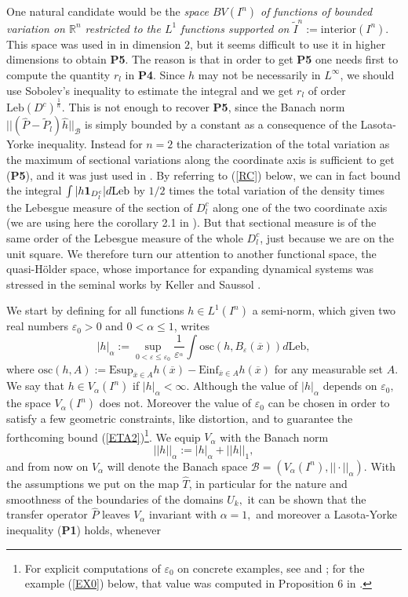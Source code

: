 \documentclass[12pt,reqno,a4paper]{amsart}
\let\tilde\widetilde
\def\Le{\text{Leb}}
\def\a{\alpha}
\def\eps{\varepsilon}
\def\ox{\overline{x}}
\def\P{\hat{P}}
\def\eps {\varepsilon}
\begin{document}
One natural candidate  would be the {\em space $BV(I^n)$  of  functions of bounded variation on $\mathbb{R}^n$ restricted to the $L^1$ functions supported on $\tilde{I}^n:=\text{interior}(I^n).$}
 This space was used in \cite{CG} in dimension $2$, but it seems difficult to use it in higher dimensions to obtain {\bf P5}. The reason is that in order to get {\bf P5} one needs first to compute the quantity $r_l$ in {\bf P4}. Since $h$ may not be necessarily in $L^{\infty}$, we should use Sobolev's inequality to estimate the integral and we get $r_l$ of order $\Le (D^c)^{\frac1n}.$ This is not enough to recover {\bf P5}, since
the Banach norm $||(\hat{P}-\tilde{P}_l)\hat{h}||_{\mathcal{B}}$ is simply bounded by a constant as a consequence of the Lasota-Yorke inequality. Instead for $n=2$ the characterization of the total variation as the maximum of sectional variations along the coordinate axis is sufficient to get ({\bf P5}), and it was just used in \cite{CG}. By referring to (\ref{RC}) below, we can in fact bound the integral $\int |h{\bf 1}_{D_l^c}|d\Le$ by $1/2$ times the total variation of the density times the Lebesgue measure of the section of $D_l^c$ along one of the two coordinate axis (we are using here the corollary 2.1 in \cite{KELI}). But that sectional measure is of the same order of the Lebesgue measure of the whole $D_l^c$, just because we are on the unit square.   We therefore turn our attention to another functional space, the quasi-H\"older space, whose importance for expanding dynamical systems was stressed in the seminal works by Keller \cite{kel}  and Saussol \cite{S}.

We start by defining for all functions $h\in L^1(I^n)$ a semi-norm, which given two real numbers $\eps_0>0$ and $0<\alpha\le 1$, writes
$$
|h|_{\alpha}:=\sup_{0<\eps\le \eps_0}\frac{1}{\eps^{_\alpha}}\int \text{osc}(h, B_{\eps}(\ox)) d\Le,
$$
where $\text{osc}(h,A):=\text{Esup}_{\ox\in A}h(\ox)-\text{Einf}_{\ox\in A}h(\ox)$ for any
measurable set $A$.  We say that $h\in V_{\a}(I^n)$ if $|h|_{\a}<\infty$. Although the value of $|h|_{\a}$ depends on $\eps_0,$    the space $ V_{\a}(I^n)$ does not. Moreover the value of $\eps_0$ can be  chosen in order to satisfy a few geometric constraints, like distortion, and to guarantee the forthcoming bound (\ref{ETA2})\footnote{For explicit computations of $\eps_0$ on concrete examples, see \cite{S} and \cite{HV}; for the example (\ref{EX0}) below, that value was computed in Proposition 6 in \cite{TSU}.}. We equip $V_{\a}$ with the Banach norm
$$
||h||_{\a}:=|h|_{\a}+||h||_1,
$$
and from now on $V_{\a}$ will denote the Banach space $\mathcal{B}=(V_{\a}(I^n), ||\cdot||_{\a}).$ With the assumptions we put on the map $\hat{T}$, in particular for the nature and smoothness of the boundaries of the domains $U_k,$ it can be shown that the transfer operator $\P$ leaves $V_{\a}$ invariant with $\a=1,$ and moreover a Lasota-Yorke inequality ({\bf P1}) holds,  whenever
\end{document}
